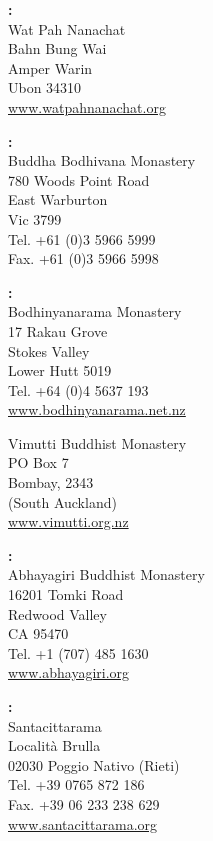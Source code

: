 \columnbreak

{\raggedright

\textbf{\MakeUppercase{\textThailand}:} \\
Wat Pah Nanachat\\
Bahn Bung Wai\\
Amper Warin\\
Ubon 34310\\
\href{http://www.watpahnanachat.org}{www.watpahnanachat.org}

\vfill

\textbf{\MakeUppercase{\textAustralia}:} \\
Buddha Bodhivana Monastery\\
780 Woods Point Road\\
East Warburton\\
Vic 3799\\
Tel. +61 (0)3 5966 5999\\
Fax. +61 (0)3 5966 5998

\vfill

\textbf{\MakeUppercase{\textNewZealand}:} \\
Bodhinyanarama Monastery\\
17 Rakau Grove\\
Stokes Valley\\
Lower Hutt 5019\\
Tel. +64 (0)4 5637 193\\
\href{http://www.bodhinyanarama.net.nz}{www.bodhinyanarama.net.nz}

Vimutti Buddhist Monastery\\
PO Box 7\\
Bombay, 2343\\
(South Auckland)\\
\href{http://www.vimutti.org.nz}{www.vimutti.org.nz}

\vfill

\textbf{\MakeUppercase{\textUnitedStates}:} \\
Abhayagiri Buddhist Monastery\\
16201 Tomki Road\\
Redwood Valley\\
CA 95470\\
Tel. +1 (707) 485 1630\\
\href{http://www.abhayagiri.org}{www.abhayagiri.org}

\vfill

\textbf{\MakeUppercase{\textItaly}:} \\
Santacittarama\\
Località Brulla\\
02030 Poggio Nativo (Rieti)\\
Tel. +39 0765 872 186\\
Fax. +39 06 233 238 629\\
\href{http://www.santacittarama.org}{www.santacittarama.org}


}